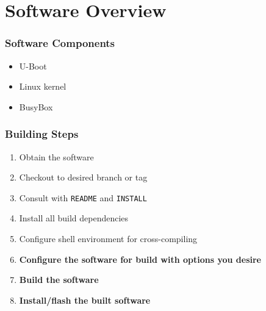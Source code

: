 \documentclass[aspectratio=169]{beamer}
\begin{document}
\section{Software Overview}

\begin{frame}
  \frametitle{Software Components}
  \begin{itemize}
    \item U-Boot
    \item Linux kernel
    \item BusyBox
  \end{itemize}
  \bigskip
  \begin{overlayarea}{\textwidth}{.4\textheight}
  \end{overlayarea}
\end{frame}

\begin{frame}
  \frametitle{Building Steps}
  \begin{enumerate}
    \item Obtain the software
    \item Checkout to desired branch or tag
    \item Consult with \texttt{README} and \texttt{INSTALL}
    \item Install all build dependencies
    \item Configure shell environment for cross-compiling
    \item \textbf{Configure the software for build with options you desire}
    \item \textbf{Build the software}
    \item \textbf{Install/flash the built software}
  \end{enumerate}
\end{frame}
\end{document}
